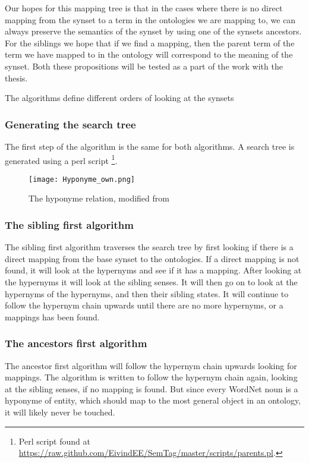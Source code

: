 Our hopes for this mapping tree is that in the cases where there is no direct mapping from the synset to a term in the 
ontologies we are mapping to, we can always preserve the semantics of the synset by using one of the synsets ancestors.
For the siblings we hope that if we find a mapping, 
then the parent term of the term we have mapped to in the ontology will correspond to the meaning of the synset.
Both these propositions will be tested as a part of the work with the thesis.

The algorithms define different orders of looking at the synsets

\subsubsection{Generating the search tree}
The first step of the algorithm is the same for both algorithms.
A search tree is generated using a perl script 
\footnote{Perl script found at \url{https://raw.github.com/EivindEE/SemTag/master/scripts/parents.pl}.}.

\begin{figure}[h]
    \begin{center}
        \texttt{[image: Hyponyme\_own.png]}
        \caption{The hyponyme relation, modified from \protect \citet{Miller1990}}
        \label{Hyponyme}
    \end{center}
\end{figure}



\subsubsection{The sibling first algorithm}
The sibling first algorithm traverses the search tree by first looking if there is a direct mapping from the base synset to the ontologies. 
If a direct mapping is not found, it will look at the hypernyms and see if it has a mapping. 
After looking at the hypernyms it will look at the sibling senses. 
It will then go on to look at the hypernyms of the hypernyms, and then their sibling states. 
It will continue to follow the hypernym chain upwards until there are no more hypernyms, or a mappings has been found.

\subsubsection{The ancestors first algorithm}
The ancestor first algorithm will follow the hypernym chain upwards looking for mappings.
The algorithm is written to follow the hypernym chain again, looking at the sibling senses, if no mapping is found.
But since every WordNet noun is a hyponyme of {entity}, which should map to the most general object in an ontology,
it will likely never be touched.


